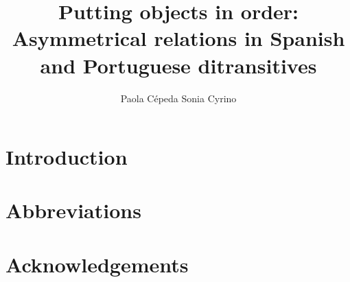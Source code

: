 \documentclass[output=paper]{langsci/langscibook}
\author{Paola Cépeda\affiliation\lastand 
Sonia Cyrino\affiliation{}}
\title{Putting objects in order: Asymmetrical relations in Spanish and Portuguese ditransitives}
\begin{document}
\section{Introduction}  
 
\section*{Abbreviations}
\section*{Acknowledgements}

\sloppy
\printbibliography[heading=subbibliography,notkeyword=this] 
\end{document}
